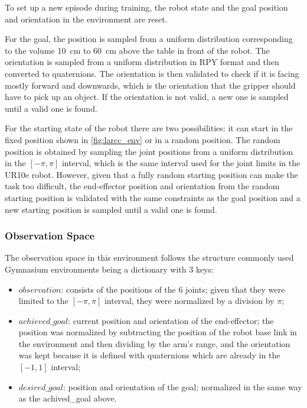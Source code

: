 To set up a new episode during training, the robot state and the goal position and orientation in the environment are reset.

For the goal, the position is sampled from a uniform distribution corresponding to the volume \SI{10}{\cm} to \SI{60}{\cm} above the table in front of the robot. The orientation is sampled from a uniform distribution in RPY format and then converted to quaternions. The orientation is then validated to check if it is facing mostly forward and downwards, which is the orientation that the gripper should have to pick up an object. If the orientation is not valid, a new one is sampled until a valid one is found.

For the starting state of the robot there are two possibilities: it can start in the fixed position shown in \autoref{fig:larcc_env} or in a random position. The random position is obtained by sampling the joint positions from a uniform distribution in the $[-\pi, \pi]$ interval, which is the same interval used for the joint limits in the UR10e robot. However, given that a fully random starting position can make the task too difficult, the end-effector position and orientation from the random starting position is validated with the same constraints as the goal position and a new starting position is sampled until a valid one is found.

\subsubsection{Observation Space}

The observation space in this environment follows the structure commonly used Gymnasium environments being a dictionary with 3 keys:

\begin{itemize}
    \item $observation$: consists of the positions of the 6 joints; given that they were limited to the $[-\pi, \pi]$ interval, they were normalized by a division by $\pi$;
    \item $achieved\_goal$: current position and orientation of the end-effector; the position was normalized by subtracting the position of the robot base link in the environment and then dividing by the arm's range, and the orientation was kept because it is defined with quaternions which are already in the $[-1, 1]$ interval;
    \item $desired\_goal$: position and orientation of the goal; normalized in the same way as the achived\_goal above.
\end{itemize}

